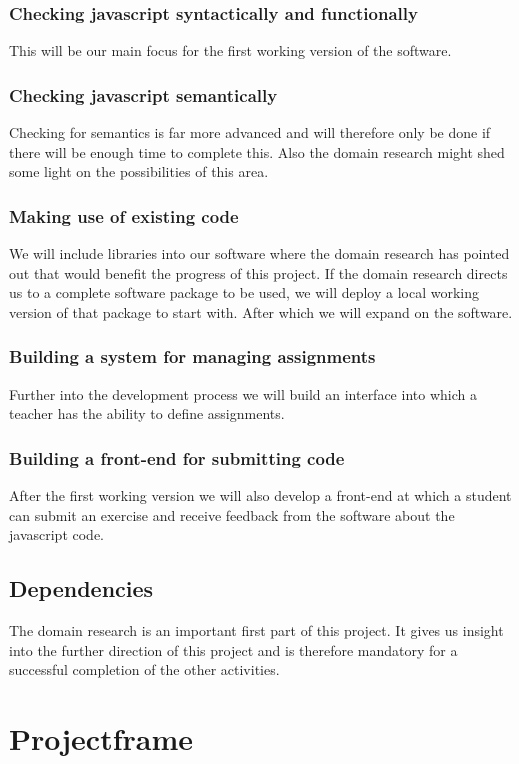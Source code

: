 \documentclass{article}
\begin{document}
\subsubsection{Checking javascript syntactically and functionally}
This will be our main focus for the first working version of the software.
\subsubsection{Checking javascript semantically}
Checking for semantics is far more advanced and will therefore only be done if there will be enough time to complete this. Also the domain research might shed some light on the possibilities of this area.
\subsubsection{Making use of existing code}
We will include libraries into our software where the domain research has pointed out that would benefit the progress of this project. If the domain research directs us to a complete software package to be used, we will deploy a local working version of that package to start with. After which we will expand on the software.
\subsubsection{Building a system for managing assignments}
Further into the development process we will build an interface into which a teacher has the ability to define assignments.
\subsubsection{Building a front-end for submitting code}
After the first working version we will also develop a front-end at which a student can submit an exercise and receive feedback from the software about the javascript code.
\subsection{Dependencies}
The domain research is an important first part of this project. It gives us insight into the further direction of this project and is therefore mandatory for a successful completion of the other activities.

\section{Projectframe}
\end{document}
